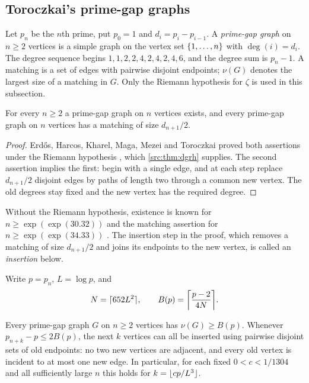 \subsection{Toroczkai's prime-gap graphs}\label{dir:sec:graphs}

Let $p_n$ be the $n$th prime, put $p_0=1$ and $d_i=p_i-p_{i-1}$. A \emph{prime-gap
graph} on $n\ge2$ vertices is a simple graph on the vertex set $\{1,\dots,n\}$ with
$\deg(i)=d_i$. The degree sequence begins $1,1,2,2,4,2,4,2,4,6$, and the degree sum is
$p_n-1$. A matching is a set of edges with pairwise disjoint endpoints; $\nu(G)$ denotes
the largest size of a matching in $G$. Only the Riemann hypothesis for $\zeta$ is used
in this subsection.

\begin{theorem}\label{dir:thm:toroczkai}
For every $n\ge2$ a prime-gap graph on $n$ vertices exists, and every prime-gap graph
on $n$ vertices has a matching of size $d_{n+1}/2$.
\end{theorem}

\begin{proof}
Erd\H{o}s, Harcos, Kharel, Maga, Mezei and Toroczkai proved both assertions under the
Riemann hypothesis \cite[Theorems~1.1 and~1.6]{ErdosEtAl2024Sequence}, which
\cref{src:thm:dgrh} supplies. The second assertion implies the first: begin with a
single edge, and at each step replace $d_{n+1}/2$ disjoint edges by paths of length two
through a common new vertex. The old degrees stay fixed and the new vertex has the
required degree.
\end{proof}

Without the Riemann hypothesis, existence is known for $n\ge\exp(\exp(30.32))$ and the
matching assertion for $n\ge\exp(\exp(34.33))$ \cite{AggarwalFrotGouWang2025Explicit}.
The insertion step in the proof, which removes a matching of size $d_{n+1}/2$ and joins
its endpoints to the new vertex, is called an \emph{insertion} below.

Write $p=p_n$, $L=\log p$, and
\[
 N=\ceil{652L^2},\qquad B(p)=\ceil*{\frac{p-2}{4N}} .
\]

\begin{theorem}\label{dir:thm:block}
Every prime-gap graph $G$ on $n\ge2$ vertices has $\nu(G)\ge B(p)$. Whenever
$p_{n+k}-p\le2B(p)$, the next $k$ vertices can all be inserted using pairwise disjoint
sets of old endpoints: no two new vertices are adjacent, and every old vertex is
incident to at most one new edge. In particular, for each fixed $0<c<1/1304$ and all
sufficiently large $n$ this holds for $k=\lfloor cp/L^3\rfloor$.
\end{theorem}

